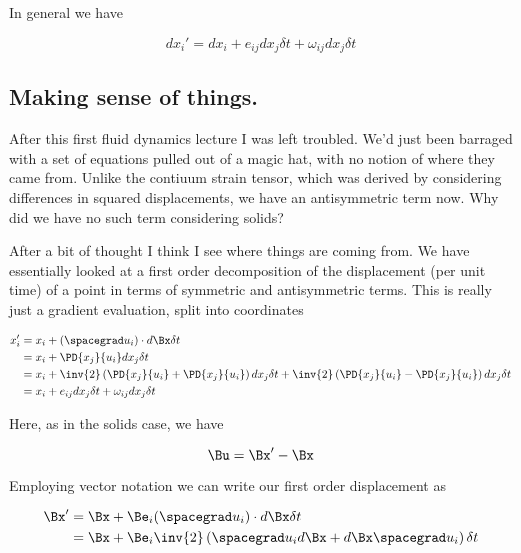 In general we have

\begin{equation}\label{eqn:continuumL8:450}
dx_i' = dx_i + e_{ij} dx_j \delta t + \omega_{ij} dx_j \delta t
\end{equation}

\subsection{Making sense of things.}

After this first fluid dynamics lecture I was left troubled.  We'd just been barraged with a set of equations pulled out of a magic hat, with no notion of where they came from.  Unlike the contiuum strain tensor, which was derived by considering differences in squared displacements, we have an antisymmetric term now.  Why did we have no such term considering solids?

After a bit of thought I think I see where things are coming from.  We have essentially looked at a first order decomposition of the displacement (per unit time) of a point in terms of symmetric and antisymmetric terms.  This is really just a gradient evaluation, split into coordinates

\begin{align*}
x_i' 
&= x_i + (\spacegrad u_i) \cdot d\Bx \delta t \\
&= x_i + \PD{x_j}{u_i} dx_j \delta t \\
&= x_i + 
\inv{2}
\left(\PD{x_j}{u_i} 
+\PD{x_j}{u_i} 
\right)
dx_j \delta t 
+
\inv{2}
\left(\PD{x_j}{u_i} 
-\PD{x_j}{u_i} 
\right)
dx_j \delta t  \\
&=
x_i + e_{ij} dx_j \delta t + \omega_{ij} dx_j \delta t
\end{align*}

Here, as in the solids case, we have

\begin{equation}\label{eqn:continuumL8:n}
\Bu = \Bx' - \Bx
\end{equation}

Employing vector notation we can write our first order displacement as

\begin{align*}
\Bx' 
&= \Bx + \Be_i (\spacegrad u_i) \cdot d\Bx \delta t \\
&= \Bx + \Be_i \inv{2}
\left(
\spacegrad u_i d\Bx
+d\Bx
\spacegrad u_i
\right)
\delta t
\end{align*}

\EndArticle
